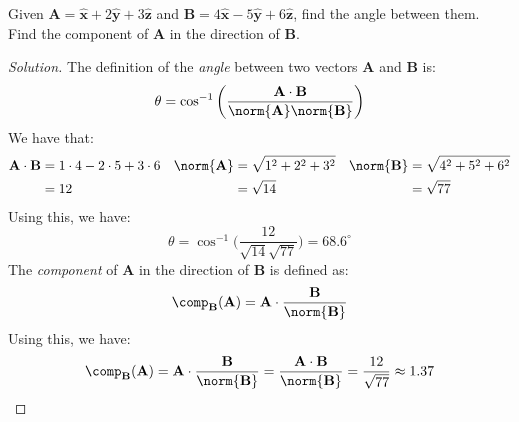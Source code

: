 \documentclass[crop=false,class=book,oneside]{standalone}
\begin{document}
            \begin{problem}[Wangsness 1-4]
                Given
                $\mathbf{A}%
                 =\hat{\mathbf{x}}+2\hat{\mathbf{y}}%
                 +3\hat{\mathbf{z}}$
                and
                $\mathbf{B}%
                 =4\hat{\mathbf{x}}-5\hat{\mathbf{y}}%
                 +6\hat{\mathbf{z}}$,
                find the angle between them. Find the component of
                $\mathbf{A}$ in the direction of $\mathbf{B}$.
            \end{problem}
            \begin{proof}[Solution]
                The definition of the \textit{angle}
                between two vectors
                $\mathbf{A}$ and $\mathbf{B}$ is:
                \begin{equation*}
                    \theta=
                    \cos^{-1}\bigg(
                        \frac{\mathbf{A}\cdot\mathbf{B}}
                        {\norm{\mathbf{A}}\norm{\mathbf{B}}}
                    \bigg)
                \end{equation*}
                We have that:
                \begin{align*}
                    \mathbf{A}\cdot\mathbf{B}
                    &=1\cdot4-2\cdot5+3\cdot6
                    &
                    \norm{\mathbf{A}}
                    &=\sqrt{1^{2}+2^{2}+3^{2}}
                    &
                    \norm{\mathbf{B}}
                    &=\sqrt{4^{2}+5^{2}+6^{2}}\\
                    &=12
                    &
                    &=\sqrt{14}
                    &
                    &=\sqrt{77}\\
                \end{align*}
                Using this, we have:
                \begin{equation*}
                    \theta=\cos^{-1}\bigg(
                        \frac{12}{\sqrt{14}{\sqrt{77}}}
                    \bigg)
                    =68.6^{\circ}
                \end{equation*}
                The \textit{component} of $\mathbf{A}$
                in the direction of
                $\mathbf{B}$ is defined as:
                \begin{equation*}
                    \comp_{\mathbf{B}}(\mathbf{A})
                    =\mathbf{A}\cdot\frac{\mathbf{B}}
                        {\norm{\mathbf{B}}}
                \end{equation*}
                Using this, we have:
                \begin{equation*}
                    \comp_{\mathbf{B}}(\mathbf{A})
                    =\mathbf{A}\cdot\frac{\mathbf{B}}
                        {\norm{\mathbf{B}}}
                    =\frac{\mathbf{A}
                        \cdot\mathbf{B}}{\norm{\mathbf{B}}}
                    =\frac{12}{\sqrt{77}}
                    \approx{1.37}
                \end{equation*}
            \end{proof}
\end{document}
